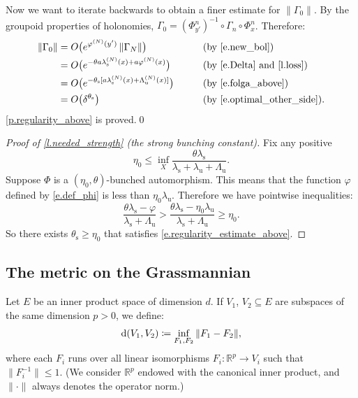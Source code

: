 \documentclass[10pt]{amsart}
\def\vcentcolon{\mathrel{\mathop\ordinarycolon}}
\providecommand\ordinarycolon{:}
\providecommand*\coloneqq{\vcentcolon\mathrel{\mkern-1.2mu}=}
\theoremstyle{plain}
\theoremstyle{definition}
\newcommand{\RR}{\mathbb{R}}
\newcommand{\dd}{\mathrm{d}}
\newcommand{\uu}{\mathrm{u}}
\renewcommand{\ss}{\mathrm{s}}
\let\phi\varphi
\begin{document}
Now we want to iterate backwards to obtain a finer estimate for $\| \Gamma_0 \|$.
By the groupoid properties of holonomies,
$\Gamma_0 = (\Phi^n_{y'})^{-1} \circ \Gamma_n \circ \Phi^n_x$.
Therefore:
\begin{alignat*}{2}
\|\Gamma_0\|
&= O \big( e^{\phi^{(N)}(y')} \, \| \Gamma_N \| \big)
&\qquad&\text{(by \eqref{e.new_bol})} \\
&= O \big( e^{-\theta a \lambda_\ss^{(N)}(x) + a \phi^{(N)}(x)} \big)
&\qquad&\text{(by \eqref{e.Delta} and \cref{l.loss})} \\
&= O \big( e^{-\theta_\ss [a \lambda_\ss^{(N)}(x) + \Lambda_\uu^{(N)}(x)]} \big)
&\qquad&\text{(by \eqref{e.folga_above})} \\
&= O \big( \delta^{\theta_\ss} \big)
&\qquad&\text{(by \eqref{e.optimal_other_side})}.
\end{alignat*}
\cref{p.regularity_above} is proved.\qed

\begin{proof}[Proof of \cref{l.needed_strength} (the strong bunching constant)]
Fix any positive
\begin{equation}\label{e.needed_strength}
\eta_0 \le \inf_X \frac{\theta \lambda_\ss}{\lambda_\ss + \lambda_\uu + \Lambda_\uu}.
\end{equation}
Suppose $\Phi$ is a $(\eta_0,\theta)$-bunched automorphism.
This means that the function $\phi$ defined by \eqref{e.def_phi} is less than $ \eta_0 \lambda_\uu$.
Therefore we have pointwise inequalities:
\[
\frac{\theta \lambda_\ss - \phi}{\lambda_\ss+\Lambda_\uu} > \frac{\theta \lambda_\ss - \eta_0 \lambda_\uu}{\lambda_\ss+\Lambda_\uu} \ge \eta_0.
\]
So there exists $\theta_\ss \ge \eta_0$ that satisfies \eqref{e.regularity_estimate_above}.
\end{proof}

\subsection{The metric on the Grassmannian}\label{ss.Grass}

Let $E$ be an inner product space of dimension $d$.
If $V_1$, $V_2 \subseteq E$ are subspaces of the same dimension $p>0$, we define:
\begin{equation}\label{e.def_metric}
\dd(V_1,V_2) \coloneqq \inf_{F_1, F_2} \| F_1 - F_2 \|,
\end{equation}
where each $F_i$ runs over all linear isomorphisms $F_i \colon \RR^p \to V_i$ such that $\|F_i^{-1}\| \le 1$.
(We consider $\RR^p$ endowed with the canonical inner product, and $\| \mathord{\cdot} \|$ always denotes the operator norm.)
\end{document}
